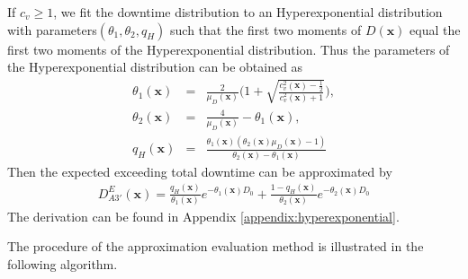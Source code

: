 \documentclass[preprint,12pt]{elsarticle}
\begin{document}
If $c_{v} \geq 1$, we fit the downtime distribution to an Hyperexponential distribution with parameters$(\theta_{1},\theta_{2}, q_{H})$ such that the first two moments of $D(\boldsymbol{x})$ equal the first two moments of the Hyperexponential distribution. Thus the parameters of the Hyperexponential distribution can be obtained as
\begin{eqnarray}
     \theta_{1}(\boldsymbol{x}) &=& \frac{2}{\mu_{D}(\boldsymbol{x})}\bigg(1+\sqrt{\frac{c^{2}_{v}(\boldsymbol{x})-\frac{1}{2}}{c^{2}_{v}(\boldsymbol{x})+1}} \bigg), \label{theta11}\\
     \theta_{2}(\boldsymbol{x}) &=& \frac{4}{\mu_{D}(\boldsymbol{x})} - \theta_{1}(\boldsymbol{x}), \label{theta12}\\
     q_{H}(\boldsymbol{x}) &=& \frac{\theta_1(\boldsymbol{x})(\theta_2(\boldsymbol{x})\mu_{D}(\boldsymbol{x})-1)}{\theta_2(\boldsymbol{x}) -\theta_1(\boldsymbol{x})} \label{q2}
\end{eqnarray}
Then the expected exceeding total downtime can be approximated by
\begin{eqnarray}
D_{A3'}^{E}(\boldsymbol{x}) =\frac{q_{H}(\boldsymbol{x})}{\theta_{1}(\boldsymbol{x})} e^{-\theta_{1}(\boldsymbol{x}) D_0 } + \frac{1-q_{H}(\boldsymbol{x})}{\theta_{2}(\boldsymbol{x})} e^{-\theta_{2}(\boldsymbol{x}) D_0} \label{EXD2}
\end{eqnarray}
The derivation can be found in Appendix \ref{appendix:hyperexponential}.


The procedure of the approximation evaluation method is illustrated in the following algorithm.
\end{document}

